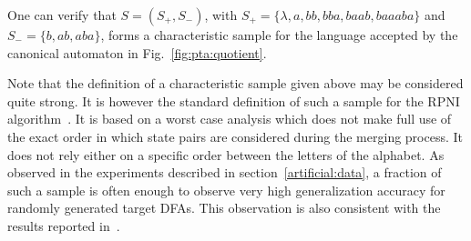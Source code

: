 One can verify that $S = (S_+, S_-)$, with $S_+ = \{\lambda, a, bb, bba, baab, baaaba\}$ and $S_- = \{b, ab, aba\}$, forms a characteristic sample for the language accepted by the canonical automaton in Fig.~\ref{fig:pta:quotient}.

Note that the definition of a characteristic sample given above may be considered quite strong. It is however the standard definition of such a sample for the RPNI algorithm~\cite{Oncina:1992,Dupont:1996b}. It is based on a worst case analysis which does not make full use of the exact order in which state pairs are considered during the merging process. It does not rely either on a specific order between the letters of the alphabet. As observed in the experiments described in section~\ref{artificial:data}, a fraction of such a sample is often enough to observe very high generalization accuracy for randomly generated target DFAs. This observation is also consistent with the results reported in~\cite{Lang:1998}.
  
